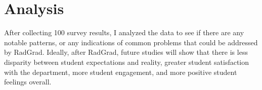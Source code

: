 \section{Analysis}
After collecting 100 survey results, I analyzed the data to see if there are any notable patterns, or any indications of common problems that could be addressed by RadGrad. Ideally, after RadGrad, future studies will show that there is less disparity between student expectations and reality, greater student satisfaction with the department, more student engagement, and more positive student feelings overall.
